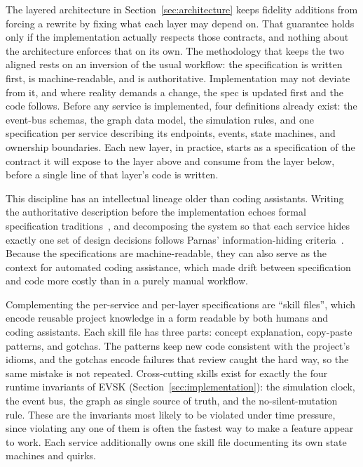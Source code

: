 \documentclass[runningheads]{llncs}
\begin{document}
The layered architecture in Section~\ref{sec:architecture} keeps fidelity additions from forcing a rewrite by fixing what each layer may depend on. That guarantee holds only if the implementation actually respects those contracts, and nothing about the architecture enforces that on its own. The methodology that keeps the two aligned rests on an inversion of the usual workflow: the specification is written first, is machine-readable, and is authoritative. Implementation may not deviate from it, and where reality demands a change, the spec is updated first and the code follows. Before any service is implemented, four definitions already exist: the event-bus schemas, the graph data model, the simulation rules, and one specification per service describing its endpoints, events, state machines, and ownership boundaries. Each new layer, in practice, starts as a specification of the contract it will expose to the layer above and consume from the layer below, before a single line of that layer's code is written.

This discipline has an intellectual lineage older than coding assistants. Writing the authoritative description before the implementation echoes formal specification traditions~\cite{lamport2002}, and decomposing the system so that each service hides exactly one set of design decisions follows Parnas' information-hiding criteria~\cite{parnas1972}. Because the specifications are machine-readable, they can also serve as the context for automated coding assistance, which made drift between specification and code more costly than in a purely manual workflow.

Complementing the per-service and per-layer specifications are ``skill files'', which encode reusable project knowledge in a form readable by both humans and coding assistants. Each skill file has three parts: concept explanation, copy-paste patterns, and gotchas. The patterns keep new code consistent with the project's idioms, and the gotchas encode failures that review caught the hard way, so the same mistake is not repeated. Cross-cutting skills exist for exactly the four runtime invariants of EVSK (Section~\ref{sec:implementation}): the simulation clock, the event bus, the graph as single source of truth, and the no-silent-mutation rule. These are the invariants most likely to be violated under time pressure, since violating any one of them is often the fastest way to make a feature appear to work. Each service additionally owns one skill file documenting its own state machines and quirks.
\end{document}
